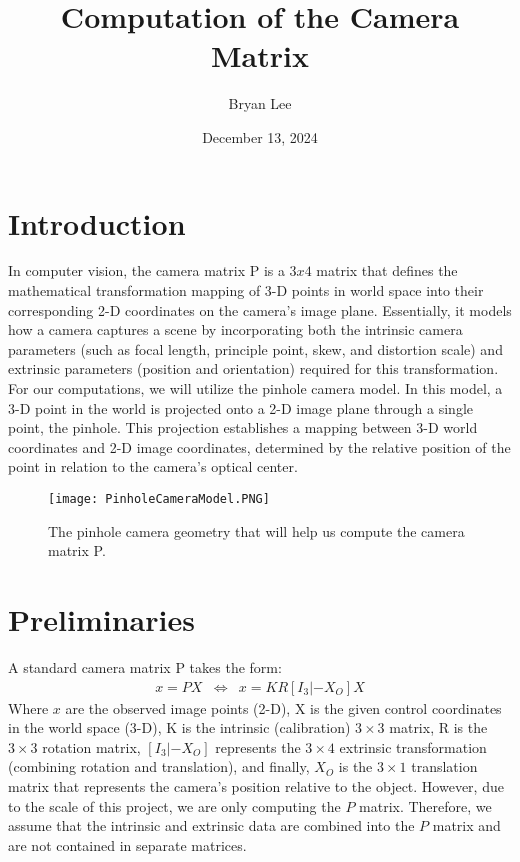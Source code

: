 \documentclass[12pt]{article}
\title{Computation of the Camera Matrix}
\author{Bryan Lee}
\date{December 13, 2024}
\begin{document}
\maketitle

\section{Introduction}
In computer vision, the camera matrix P is a \( 3x 4\) matrix that defines the mathematical transformation mapping of 3-D points in world space into their corresponding 2-D coordinates on the camera's image plane. Essentially, it models how a camera captures a scene by incorporating both the intrinsic camera parameters (such as focal length, principle point, skew, and distortion scale) and extrinsic parameters (position and orientation) required for this transformation. For our computations, we will utilize the pinhole camera model. In this model, a 3-D point in the world is projected onto a 2-D image plane through a single point, the pinhole. This projection establishes a mapping between 3-D world coordinates and 2-D image coordinates, determined by the relative position of the point in relation to the camera's optical center.

\begin{figure}[ht]
    \centering
    \texttt{[image: PinholeCameraModel.PNG]}
    \caption{The pinhole camera geometry that will help us compute the camera matrix P.}
\end{figure}

\section{Preliminaries}
A standard camera matrix P takes the form:
\[
	\begin{array}{rrcl}
        x = PX & \Leftrightarrow & x = KR[I_3 | -X_O]X
	\end{array}
\]
Where \( x \) are the observed image points (2-D), X is the given control coordinates in the world space (3-D), K is the intrinsic (calibration) \( 3 \times 3 \) matrix, R is the \( 3 \times 3 \) rotation matrix, \( [I_3 | -X_O] \) represents the \( 3 \times 4 \) extrinsic transformation (combining rotation and translation), and finally, \( X_O \) is the \( 3 \times 1 \) translation matrix that represents the camera's position relative to the object. \noindent However, due to the scale of this project, we are only computing the \( P \) matrix. Therefore, we assume that the intrinsic and extrinsic data are combined into the \( P \) matrix and are not contained in separate matrices. \\
\end{document}
